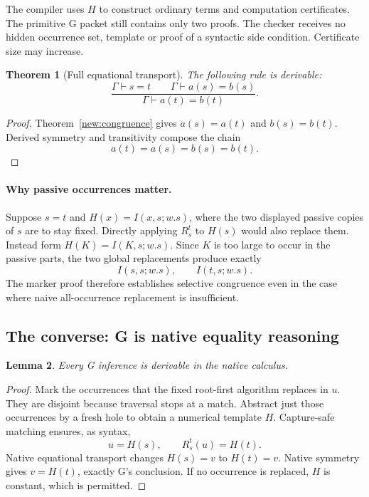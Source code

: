 \documentclass[11pt,letterpaper]{article}
\newtheorem{theorem}{Theorem}[section]
\newtheorem{lemma}[theorem]{Lemma}
\theoremstyle{definition}
\theoremstyle{remark}
\begin{document}
The compiler uses $H$ to construct ordinary terms and computation
certificates. The primitive G packet still contains only two proofs.
The checker receives no hidden occurrence set, template or proof of a
syntactic side condition. Certificate size may increase.

\begin{theorem}[Full equational transport]\label{new:transport}
The following rule is derivable:
\[
 \frac{\Gamma\vdash s=t\qquad\Gamma\vdash a(s)=b(s)}
      {\Gamma\vdash a(t)=b(t)}.
 \tag{Tr}
\]
\end{theorem}
\begin{proof}
Theorem~\ref{new:congruence} gives $a(s)=a(t)$ and $b(s)=b(t)$.
Derived symmetry and transitivity compose the chain
\[
                  a(t)=a(s)=b(s)=b(t).
\]
\end{proof}

\paragraph{Why passive occurrences matter.}
Suppose $s=t$ and $H(x)=I(x,s;w.s)$, where the two displayed passive
copies of $s$ are to stay fixed. Directly applying $R_s^t$ to $H(s)$
would also replace them. Instead form $H(K)=I(K,s;w.s)$.
Since $K$ is too large to occur in the passive parts, the two global
replacements produce exactly
\[
                  I(s,s;w.s),\qquad I(t,s;w.s).
\]
The marker proof therefore establishes selective congruence even in
the case where naive all-occurrence replacement is insufficient.

\subsection{The converse: G is native equality reasoning}

\begin{lemma}\label{new:gsound}
Every G inference is derivable in the native calculus.
\end{lemma}
\begin{proof}
Mark the occurrences that the fixed root-first algorithm replaces in
$u$. They are disjoint because traversal stops at a match. Abstract just
those occurrences by a fresh hole to obtain a numerical template $H$.
Capture-safe matching ensures, as syntax,
\[
                       u=H(s),\qquad R_s^t(u)=H(t).
\]
Native equational transport changes $H(s)=v$ to $H(t)=v$.
Native symmetry gives $v=H(t)$, exactly G's conclusion. If no occurrence
is replaced, $H$ is constant, which is permitted.
\end{proof}
\end{document}
